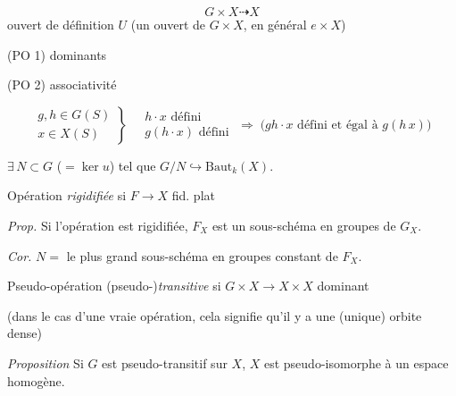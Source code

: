 \documentclass[11pt,a4paper]{article}
\begin{document}
\[
  G \times X \dashrightarrow X
\]
ouvert de définition $U$ (un ouvert de $G \times X$, \ill{} en général
\ill{} $e \times X$)

(PO 1)  dominants

(PO 2) associativité



\[
  \left.
  \begin{array}{l}
    g, h \in G(S) \\
    x \in X(S)
  \end{array}
  \right\}
  \quad
  \begin{array}{l}
    h \cdot x \text{ défini} \\
    g(h \cdot x) \text{ défini}
  \end{array}
  \;\Longrightarrow\;
  \bigl(gh \cdot x \text{ défini et égal à } g(h\,x)\bigr)
\]

$\exists\, N \subset G$ ($= \ker u$) tel que \ill{} $G/N \hookrightarrow
\mathrm{Baut}_k(X)$.



Opération \emph{rigidifiée} si $F \to X$ fid. plat

\emph{Prop.} Si l'opération est rigidifiée, $F_X$ est un sous-schéma en groupes
de $G_X$.

\emph{Cor.} $N =$ le plus grand sous-schéma en groupes constant de $F_X$.

Pseudo-opération (pseudo-)\emph{transitive} si $G \times X \to X \times X$
dominant

(dans le cas d'une vraie opération, cela signifie qu'il y a une (unique) orbite
dense)

\emph{Proposition} Si $G$ est pseudo-transitif sur $X$, $X$ est
pseudo-isomorphe à un espace homogène.
\end{document}
